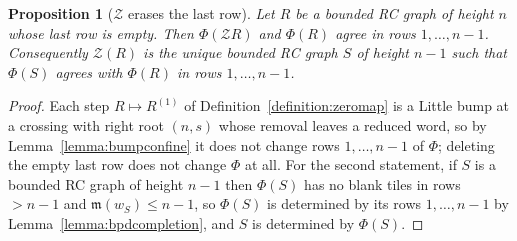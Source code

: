\documentclass{amsart}
\newtheorem{proposition}[lemma]{Proposition}
\theoremstyle{definition}
\theoremstyle{remark}
\numberwithin{equation}{subsection}
\newcommand{\wof}[1]{w_{#1}}
\newcommand{\zeromap}{\mathcal{Z}}
\newcommand{\maxd}{\mathfrak{m}}
\begin{document}
\begin{proposition}[$\zeromap$ erases the last row]\label{proposition:zerotrunc}
Let $R$ be a bounded RC graph of height $n$ whose last row is empty. Then $\Phi(\zeromap R)$ and $\Phi(R)$ agree in rows $1,\ldots,n-1$. Consequently $\zeromap(R)$ is the unique bounded RC graph $S$ of height $n-1$ such that $\Phi(S)$ agrees with $\Phi(R)$ in rows $1,\ldots,n-1$.
\end{proposition}
\begin{proof}
Each step $R\mapsto R^{(1)}$ of Definition~\ref{definition:zeromap} is a Little bump at a crossing with right root $(n,s)$ whose removal leaves a reduced word, so by Lemma~\ref{lemma:bumpconfine} it does not change rows $1,\ldots,n-1$ of $\Phi$; deleting the empty last row does not change $\Phi$ at all. For the second statement, if $S$ is a bounded RC graph of height $n-1$ then $\Phi(S)$ has no blank tiles in rows $>n-1$ and $\maxd(\wof S)\leq n-1$, so $\Phi(S)$ is determined by its rows $1,\ldots,n-1$ by Lemma~\ref{lemma:bpdcompletion}, and $S$ is determined by $\Phi(S)$.
\end{proof}
\end{document}
